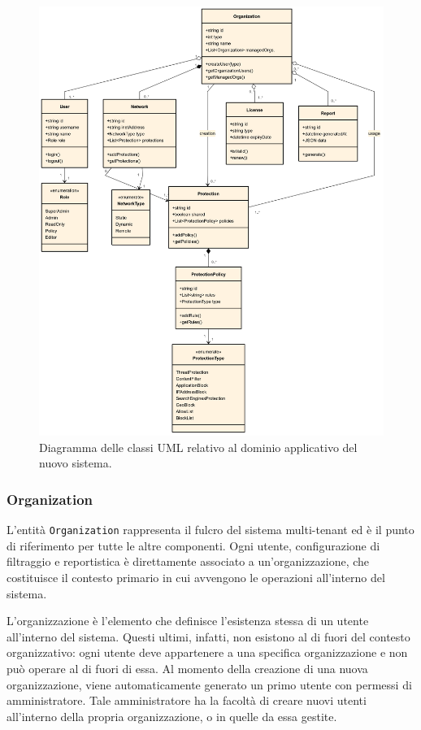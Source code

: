 \begin{figure}
  \centering
  \includegraphics[width=1\textwidth]{figures/domain-model.png}
  \caption{Diagramma delle classi UML relativo al dominio applicativo del nuovo sistema.}
  \label{fig:domain_model}
\end{figure}

\subsubsection{Organization}
L'entità \texttt{Organization} rappresenta il fulcro del sistema multi-tenant ed è il punto di riferimento per tutte le altre componenti. Ogni utente, configurazione di filtraggio e reportistica è direttamente associato a un'organizzazione, che costituisce il contesto primario in cui avvengono le operazioni all'interno del sistema.

L'organizzazione è l'elemento che definisce l'esistenza stessa di un utente all'interno del sistema. Questi ultimi, infatti, non esistono al di fuori del contesto organizzativo: ogni utente deve appartenere a una specifica organizzazione e non può operare al di fuori di essa. Al momento della creazione di una nuova organizzazione, viene automaticamente generato un primo utente con permessi di amministratore. Tale amministratore ha la facoltà di creare nuovi utenti all'interno della propria organizzazione, o in quelle da essa gestite.

